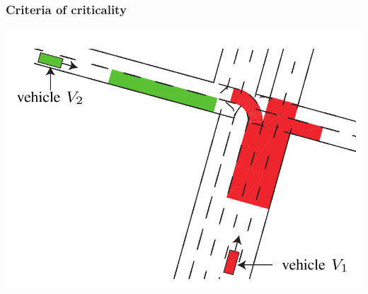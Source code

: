 \documentclass{beamer}
\begin{document}
\begin{frame}
    \frametitle{Criteria of criticality}
    \includegraphics[height=0.85\textheight]{drivableArea.png}
\end{frame}
\end{document}
